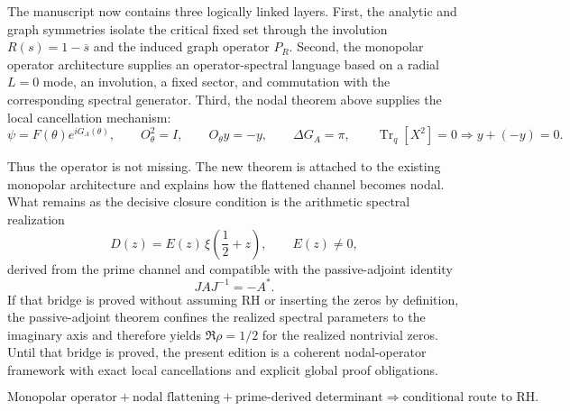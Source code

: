 \documentclass[11pt,letterpaper]{amsart}
\theoremstyle{definition}
\begin{document}
The manuscript now contains three logically linked layers. First, the analytic and graph
symmetries isolate the critical fixed set through the involution \(R(s)=1-\overline{s}\) and
the induced graph operator \(P_R\). Second, the monopolar operator architecture supplies an
operator-spectral language based on a radial \(L=0\) mode, an involution, a fixed sector, and
commutation with the corresponding spectral generator. Third, the nodal theorem above supplies
the local cancellation mechanism:
\[
  \psi=F(\theta)e^{iG_A(\theta)},\qquad
  O_\theta^2=I,\qquad
  O_\theta y=-y,\qquad
  \Delta G_A=\pi,\qquad
  \operatorname{Tr}_q[X^2]=0
  \Longrightarrow y+(-y)=0.
\]

Thus the operator is not missing. The new theorem is attached to the existing monopolar
architecture and explains how the flattened channel becomes nodal. What remains as the
decisive closure condition is the arithmetic spectral realization
\[
  D(z)=E(z)\,\xi\!\left(\frac12+z\right),\qquad E(z)\neq 0,
\]
derived from the prime channel and compatible with the passive-adjoint identity
\[
  JAJ^{-1}=-A^*.
\]
If that bridge is proved without assuming RH or inserting the zeros by definition, the
passive-adjoint theorem confines the realized spectral parameters to the imaginary axis and
therefore yields \(\Re\rho=1/2\) for the realized nontrivial zeros. Until that bridge is proved,
the present edition is a coherent nodal-operator framework with exact local cancellations and
explicit global proof obligations.

\[
\boxed{
\text{Monopolar operator}+\text{nodal flattening}+\text{prime-derived determinant}
\Longrightarrow \text{conditional route to RH.}
}
\]
\end{document}
